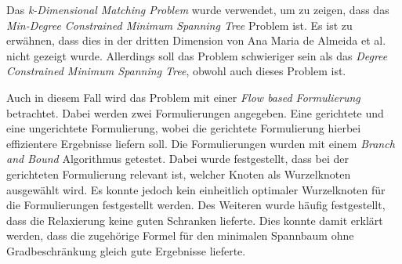 Das \emph{k-Dimensional Matching Problem} wurde verwendet, um zu zeigen, dass das \emph{Min-Degree Constrained Minimum Spanning Tree} Problem \NP{} ist.
Es ist zu erwähnen, dass dies in der dritten Dimension von Ana Maria de Almeida et al. nicht gezeigt wurde.
Allerdings soll das Problem schwieriger sein als das \emph{Degree Constrained Minimum Spanning Tree}, obwohl auch dieses Problem \NP{} ist.

Auch in diesem Fall wird das Problem mit einer \emph{Flow based Formulierung} betrachtet.
Dabei werden zwei Formulierungen angegeben.
Eine gerichtete und eine ungerichtete Formulierung, wobei die gerichtete Formulierung hierbei effizientere Ergebnisse liefern soll.
Die Formulierungen wurden mit einem \emph{Branch and Bound} Algorithmus getestet.
Dabei wurde festgestellt, dass bei der gerichteten Formulierung relevant ist, welcher Knoten als Wurzelknoten ausgewählt wird.
Es konnte jedoch kein einheitlich optimaler Wurzelknoten für die Formulierungen festgestellt werden.
Des Weiteren wurde häufig festgestellt, dass die Relaxierung keine guten Schranken lieferte.
Dies konnte damit erklärt werden, dass die zugehörige Formel für den minimalen Spannbaum ohne Gradbeschränkung gleich gute Ergebnisse lieferte.


\newpage
